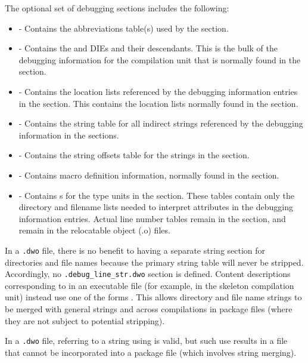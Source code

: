 The optional set of debugging sections includes the following:
\begin{itemize}
\item
\dotdebugabbrevdwo{} - Contains the abbreviations table(s) used by
the \dotdebuginfodwo{} section.
\item
\dotdebuginfodwo{} - Contains the \DWTAGcompileunit{} and
\DWTAGtypeunit{} DIEs and
their descendants. This is the bulk of the debugging
information for the compilation unit that is normally found
in the \dotdebuginfo{} section.
\item
\dotdebugloclistsdwo{} - Contains the location lists referenced by
the debugging information entries in the \dotdebuginfodwo{}
section. This contains the location lists normally found in 
the \dotdebugloclists{} section.
\item
\dotdebugstrdwo{} - Contains the string table for all indirect
strings referenced by the debugging information in the
\dotdebuginfodwo{} sections.
\item
\dotdebugstroffsetsdwo{} - Contains the string offsets table
for the strings in the \dotdebugstrdwo{}{} section.
\item
\dotdebugmacrodwo{} - Contains macro definition information,
normally found in the \dotdebugmacro{} section.
\item
\dotdebuglinedwo{} - Contains s 
for the type units in the \dotdebuginfodwo{} section. These tables
contain only the directory and filename lists needed to
interpret \DWATdeclfile{} attributes in the debugging
information entries. Actual line number tables remain in the
\dotdebugline{} section, and remain in the relocatable object
(.o) files.

\end{itemize}

In a \texttt{.dwo} file, there is no benefit to having a separate string
section for directories and file names because the primary
string table will never be stripped. Accordingly, no
\texttt{.debug\_line\_str.dwo} section is defined. Content descriptions 
corresponding to \DWFORMlinestrp{} in an executable file (for example, 
in the skeleton compilation unit) instead use one of the forms
\DWFORMstrxXNor. This allows
directory and file name strings to be merged with general
strings and across compilations in package files 
(where they are not subject to potential stripping).

In a \texttt{.dwo} file, referring to a string using \DWFORMstrp{}
is valid, but such use 
results in a file that cannot be incorporated into a package file
(which involves string merging).

